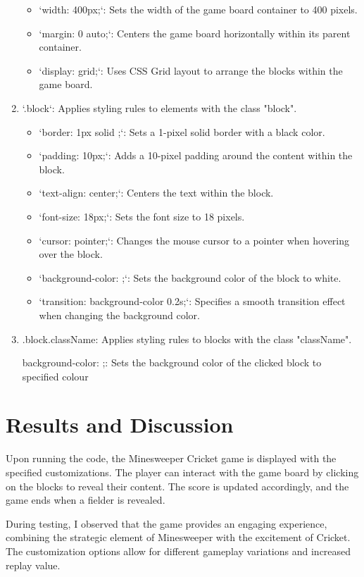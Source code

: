 \documentclass{article}
\begin{document}
\begin{enumerate}
\begin{itemize}
   \item `width: 400px;`: Sets the width of the game board container to 400 pixels.
   \item `margin: 0 auto;`: Centers the game board horizontally within its parent container.
   \item `display: grid;`: Uses CSS Grid layout to arrange the blocks within the game board.
\end{itemize}
\item  `.block`: Applies styling rules to elements with the class "block".
\begin{itemize}
     

   \item `border: 1px solid ;`: Sets a 1-pixel solid border with a black color.
   \item `padding: 10px;`: Adds a 10-pixel padding around the content within the block.
   \item `text-align: center;`: Centers the text within the block.
   \item `font-size: 18px;`: Sets the font size to 18 pixels.
   \item `cursor: pointer;`: Changes the mouse cursor to a pointer when hovering over the block.
   \item `background-color: ;`: Sets the background color of the block to white.
   \item `transition: background-color 0.2s;`: Specifies a smooth transition effect when changing the background color.
\end{itemize}
\item  .block.{className}: Applies styling rules to blocks with the class "className".

   background-color: ;: Sets the background color of the clicked block to specified colour

\end{enumerate}
\section{Results and Discussion}
Upon running the code, the Minesweeper Cricket game is displayed with the specified customizations. The player can interact with the game board by clicking on the blocks to reveal their content. The score is updated accordingly, and the game ends when a fielder is revealed.

During testing, I observed that the game provides an engaging experience, combining the strategic element of Minesweeper with the excitement of Cricket. The customization options allow for different gameplay variations and increased replay value.
\end{document}
